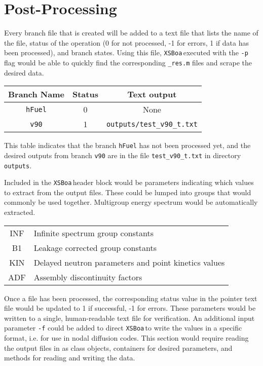 \documentclass{article}
\newcommand{\boa}{\texttt{XSBoa}\,}
\begin{document}
\section{Post-Processing} \label{sec:postProc}
Every branch file that is created will be added to a text file that lists the name of the file, status of the operation (0 for not processed, -1 for errors, 1 if data has been processed), and branch states.
Using this file, \boa executed with the \texttt{-p} flag would be able to quickly find the corresponding \texttt{\_res.m} files and scrape the desired data.
\begin{table}[h!]
	\begin{tabular}{ccc}
		Branch Name & Status & Text output \\
		\hline 
		\hline
		\texttt{hFuel} & 0 & None \\
		\texttt{v90} & 1 & \texttt{outputs/test\_v90\_t.txt} \\
	\end{tabular}
\end{table}
This table indicates that the branch \texttt{hFuel} has not been processed yet, and the desired outputs from branch \texttt{v90} are in the file \texttt{test\_v90\_t.txt} in directory \texttt{outputs}.

Included in the \boa header block would be parameters indicating which values to extract from the output files. 
These could be lumped into groups that would commonly be used together.
Multigroup energy spectrum would be automatically extracted.

\begin{table}[h!]
\begin{tabular}{c|l}
	INF & Infinite spectrum group constants \\
	B1 & Leakage corrected group constants \\
	KIN & Delayed neutron parameters and point kinetics values \\
	ADF & Assembly discontinuity factors \\
\end{tabular}
\end{table}

Once a file has been processed, the corresponding status value in the pointer text file would be updated to 1 if successful, -1 for errors.
These parameters would be written to a single, human-readable text file for verification.
An additional input parameter \texttt{-f} could be added to direct \boa to write the values in a specific format, i.e. for use in nodal diffusion codes.
This section would require reading the output files in as class objects, containers for desired parameters, and methods for reading and writing the data.
\end{document}

